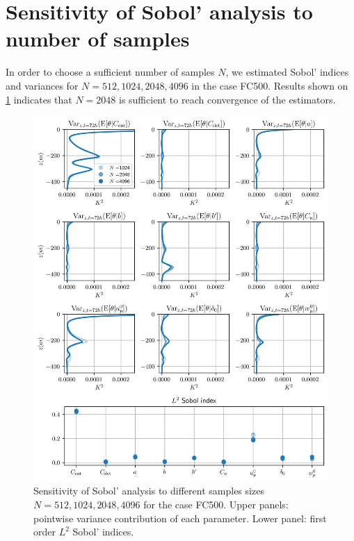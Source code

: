 \documentclass[draft]{agujournal2019}
\begin{document}
\section{Sensitivity of Sobol' analysis to number of samples} \label{apdx: sensitivity of sobol}
In order to choose a sufficient number of samples $N$, we estimated Sobol' indices and variances for $N=512,1024,2048,4096$ in the case FC500. Results shown on \ref{fig: sensitivity of sobol} indicates that $N=2048$ is sufficient to reach convergence of the estimators.  
%
\begin{figure}
    \includegraphics[width=\textwidth]{figures/sensitivity_of_variance_FC500.png}
    \caption{Sensitivity of Sobol' analysis to different samples sizes $N=512,1024,2048,4096$ for the case FC500. Upper panels: pointwise variance contribution of each parameter. Lower panel: first order $L^2$ Sobol' indices.}
    \label{fig: sensitivity of sobol}
\end{figure}
%
%
%
\end{document}
